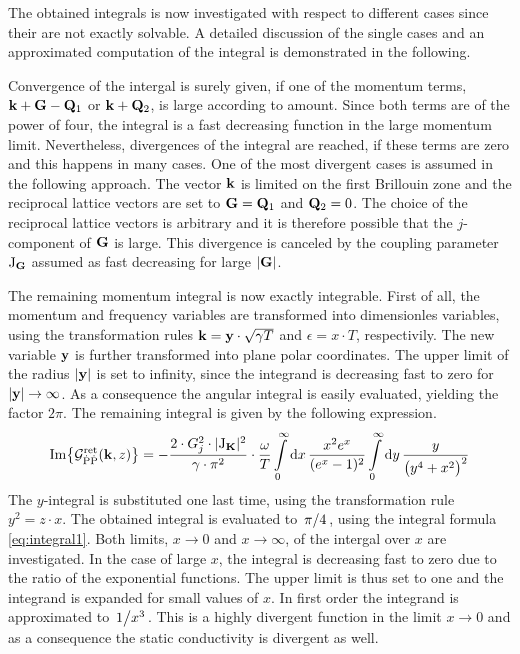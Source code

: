The obtained integrals is now investigated with respect to different cases since their are not exactly solvable.
A detailed discussion of the single cases and an approximated computation of the integral is demonstrated in the following.

%
%
%
%
Convergence of the intergal is surely given, if one of the momentum terms, $\vb{k}+\vb{G}-\vb{Q}_{1}$ or $\vb{k} + \vb{Q}_{2}$, is large according to amount.
Since both terms are of the power of four, the integral is a fast decreasing function in the large momentum limit.
Nevertheless, divergences of the integral are reached, if these terms are zero and this happens in many cases.
One of the most divergent cases is assumed in the following approach.
The vector $\vb{k}$ is limited on the first Brillouin zone and the reciprocal lattice vectors are set to $\vb{G} = \vb{Q}_{1}$ and $\vb{Q}_{2} = 0$.
The choice of the reciprocal lattice vectors is arbitrary and it is therefore possible that the $j$-component of $\vb{G}$ is large.
This divergence is canceled by the coupling parameter $\mathrm{J}_{\vb{G}}$ assumed as fast decreasing for large $|\vb{G}|$.

The remaining momentum integral is now exactly integrable.
First of all, the momentum and frequency variables are transformed into dimensionles variables, using the transformation rules $\vb{k} = \vb{y} \cdot \sqrt{\gamma T}$ and $\epsilon = x \cdot T$, respectivily.
The new variable $\vb{y}$ is further transformed into plane polar coordinates.
The upper limit of the radius $|\vb{y}|$ is set to infinity, since the integrand is decreasing fast to zero for $|\vb{y}| \to \infty$.
As a consequence the angular integral is easily evaluated, yielding the factor $2\pi$.
The remaining integral is given by the following expression.
%
\begin{align}
	\Im{\mathcal{G}_{\dot{\mathrm{P}}\dot{\mathrm{P}}}^{\mathrm{ret}}(\vb{k}, z)} = 
		 -\frac{2 \cdot G_{j}^{2} \cdot \vert \mathrm{J}_{\vb{K}} \vert^{2}}{\gamma \cdot \pi^{2}} \cdot \frac{\omega}{T}
		\int\limits_{0}^{\infty} \dd{x}
		\frac{x^{2} e^{x}}{(e^{x} - 1)^{2}}
		\int\limits_{0}^{\infty} \dd{y}
		\frac{y}{\big(y^{4} + x^{2}\big)^{2}}
\end{align}
%
The $y$-integral is substituted one last time, using the transformation rule $y^{2} = z \cdot x$.
The obtained integral is evaluated to $\flatfrac{\pi}{4}$, using the integral formula \eqref{eq:integral1}.
Both limits, $x \to 0$ and $x \to \infty$, of the intergal over $x$ are investigated.
In the case of large $x$, the integral is decreasing fast to zero due to the ratio of the exponential functions.
The upper limit is thus set to one and the integrand is expanded for small values of $x$.
In first order the integrand is approximated to $\flatfrac{1}{x^{3}}$.
This is a highly divergent function in the limit $x \to 0$ and as a consequence the static conductivity is divergent as well.

